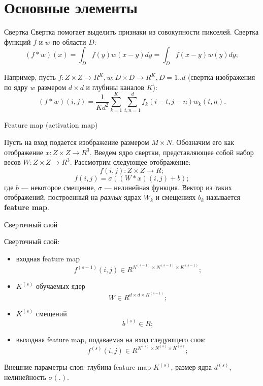 \documentclass[11pt, intlimits]{beamer}
\begin{document}
\section{Основные элементы}

\begin{frame}{Свертка}
Свертка помогает выделить признаки из совокупности пикселей. Свертка функций $f$ и $w$ по области $D$:
$$
(f*w)(x)=\int_D f(y)w(x-y)dy=\int_D f(x-y)w(y)dy;
$$

Например, пусть $f:Z \times Z \to R^K, w: D \times D \to R^K, D = 1..d$ (свертка изображения по ядру $w$ размером $d \times d$ и глубины каналов $K$):
$$
(f*w)(i,j)=\frac{1}{Kd^2}\sum_{k=1}^K \sum_{t,n =1}^d f_k(i-t, j-n) w_k(t,n).
$$


\end{frame}

\begin{frame}{Feature map (activation map)}

Пусть на вход подается изображение размером $M \times N$. Обозначим его как отображение $x: Z \times Z \to R^3$.
Введем ядро свертки, представляющее собой набор весов $W: Z \times Z \to R^3$. Рассмотрим следующее отображение:
$$
f(i, j): Z \times Z \to R;
$$
$$
f(i, j) = \sigma((W*x)(i, j) + b);
$$
где $b$ --- некоторое смещение, $\sigma$ --- нелинейная функция. Вектор из таких отображений, построенный на \textit{разных} ядрах $W_k$ и смещениях $b_k$ называется \textbf{feature map}. 

\end{frame}

\begin{frame}{Сверточный слой}

Сверточный слой: 
\begin{itemize}
\item входная feature map 
$$
f^{(s-1)}(i, j) \in R^{N^{(s-1)} \times N^{(s-1)} \times K^{(s-1)}};
$$

\item $K^{(s)}$ обучаемых ядер 
$$
W \in R^{d \times d \times K^{(s-1)}};
$$

\item $K^{(s)}$ смещений 
$$
b^{(s)} \in R;
$$

\item выходная feature map, подаваемая на вход следующего слоя: 
$$
f^{(s)}(i, j) \in R^{N^{(s)} \times N^{(s)} \times K^{(s)}};
$$

\end{itemize}

Внешние параметры слоя: глубина feature map $K^{(s)}$, размер ядра $d^{(s)}$, нелинейность $\sigma(.)$.

\end{frame}
\end{document}
